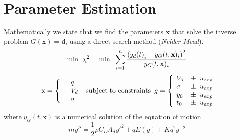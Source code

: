 \documentclass[10pt,a4paper]{article}
\begin{document}
\section*{Parameter Estimation}
Mathematically we state that we find the parameters $\mathbf{x}$ that solve the inverse problem $G(\mathbf{x}) = \mathbf{d}$, using a direct search method (\emph{Nelder-Mead}). 
\[
\mbox{min} \hspace{2 mm} \chi^2 = \mbox{min} \hspace{2 mm} \sum^n_{i=1} \frac{\left({y_d(t)}_i - y_G(t, \mathbf{x})_i \right)^2}{y_G(t, \mathbf{x})_i}
\]
\begin{eqnarray*} \mbox{} \hspace{2 mm} \begin{split} \mathbf{x} = \left\{ \begin{array}{ll}      & q\\
		  &	V_d\\
          & \sigma 
          \end{array} \right. 
          \end{split} \hspace{2 mm} \mbox{subject to constraints} \hspace{2 mm} \begin{split}
          g = \left\{ \begin{array}{ll}
           V_d &\pm \hspace{2 mm} u_{exp}\\
      	   \sigma &\pm  \hspace{2 mm} u_{exp}\\
      	   y_0 &\pm \hspace{2 mm} u_{exp}\\
      	   t_0 &\pm \hspace{2 mm} u_{exp}\\
          \end{array} \right. 
          \end{split}
\end{eqnarray*}
where $y_G(t, \mathbf{x})$ is a numerical solution of the equation of motion
\[
m y'' = \frac{1}{2} \rho C_D A_d {y'}^2 + q E(y) + K q^2 y^{-2} \]
\end{document}
